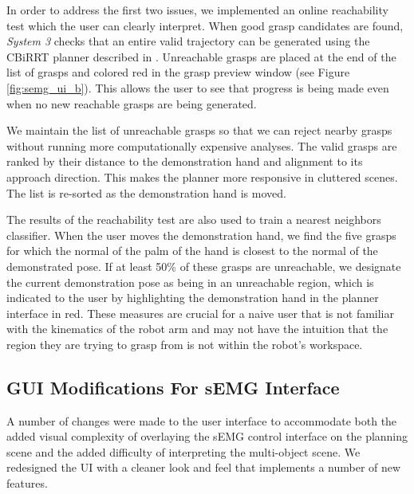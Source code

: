 In order to address the first two issues, we implemented an online reachability test which the user can clearly interpret. When good grasp candidates are found, \emph{System 3} checks that an entire valid trajectory can be generated using the CBiRRT planner described in \cite{berenson-09}. Unreachable grasps are placed at the end of the list of grasps and colored red in the grasp preview window (see Figure \ref{fig:semg_ui_b}). This allows the user to see that progress is being made even when no new reachable grasps are being generated.

We maintain the list of unreachable grasps so that we can reject nearby grasps without running more computationally expensive analyses. The valid grasps are ranked by their distance to the demonstration hand and alignment to its approach direction. This makes the planner more responsive in cluttered scenes. The list is re-sorted as the demonstration hand is moved.

The results of the reachability test are also used to train a nearest neighbors classifier. When the user moves the demonstration hand, we find the five grasps for which the normal of the palm of the hand is closest to the normal of the demonstrated pose. If at least 50\% of these grasps are unreachable, we designate the current demonstration pose as being in an unreachable region, which is indicated to the user by highlighting the demonstration hand in the planner interface in red. These measures are crucial for a naive user that is not familiar with the kinematics of the robot arm and may not have the intuition that the region they are trying to grasp from is not within the robot's workspace.

\subsection{GUI Modifications For sEMG Interface}
 A number of changes were made to the user interface to accommodate both the added visual complexity of overlaying the sEMG control interface on the planning scene and the added difficulty of interpreting the multi-object scene. We redesigned the UI with a cleaner look and feel that implements a number of new features. 

